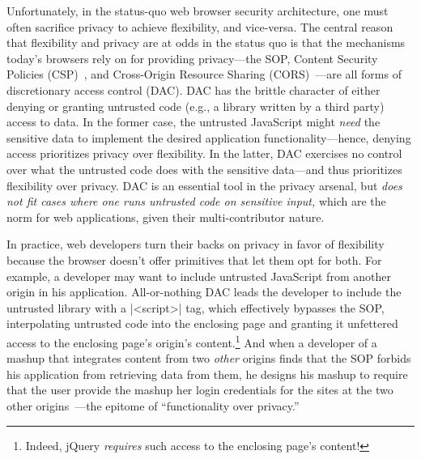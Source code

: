 Unfortunately, in the status-quo web browser security architecture,
one must often sacrifice privacy to achieve flexibility, and
vice-versa. The central reason that flexibility and privacy are at
odds in the status quo is that the mechanisms today's browsers rely on
for providing privacy---the SOP, Content Security Policies
(CSP)~\cite{csp}, and Cross-Origin Resource Sharing
(CORS)~\cite{cors13}---are all forms of discretionary access control
(DAC). DAC has the brittle character of either denying or granting
untrusted code (e.g., a library written by a third party) access to
data. In the former case, the untrusted JavaScript might {\em need}
the sensitive data to implement the desired application
functionality---hence, denying access prioritizes privacy over
flexibility. In the latter, DAC exercises no control over what the
untrusted code does with the sensitive data---and thus prioritizes
flexibility over privacy. DAC is an essential tool in the privacy
arsenal, but {\em does not fit cases where one runs untrusted code on
  sensitive input,} which are the norm for web applications, given
their multi-contributor nature.

In practice, web developers turn their backs on privacy in favor of
flexibility because the browser doesn't offer primitives that let them
opt for both. For example, a developer may want to include untrusted
JavaScript from another origin in his application. All-or-nothing DAC
leads the developer to include the untrusted library with a
\js|<script>| tag, which effectively bypasses the SOP, interpolating
untrusted code into the enclosing page and granting it unfettered
access to the enclosing page's origin's content.\footnote{Indeed,
  jQuery \emph{requires} such access to the enclosing page's content!}
And when a developer of a mashup that integrates content from two {\em
  other} origins finds that the SOP forbids his application from
retrieving data from them, he designs his mashup to require that the
user provide the mashup her login credentials for the sites at the two
other origins~\cite{mint.com}---the epitome of ``functionality over
privacy.''

%


